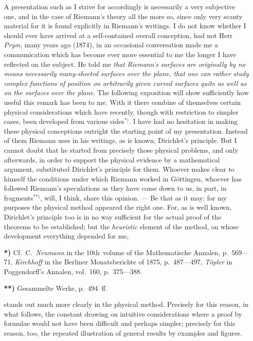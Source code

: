 \documentclass{article}
\begin{document}
A presentation such as I strive for accordingly is necessarily a very subjective one, and in the case of Riemann's theory all the more so, since only very scanty material for it is found explicitly in Riemann's writings. I do not know whether I should ever have arrived at a self-contained overall conception, had not Herr \emph{Prym}, many years ago (1874), in an occasional conversation made me a communication which has become ever more essential to me the longer I have reflected on the subject. He told me \emph{that Riemann's surfaces are originally by no means necessarily many-sheeted surfaces over the plane, that one can rather study complex functions of position on arbitrarily given curved surfaces quite as well as on the surfaces over the plane}. The following exposition will show sufficiently how useful this remark has been to me. With it there combine of themselves certain physical considerations which have recently, though with restriction to simpler cases, been developed from various sides${}^{*)}$. I have had no hesitation in making these physical conceptions outright the starting point of my presentation. Instead of them Riemann uses in his writings, as is known, Dirichlet's principle. But I cannot doubt that he started from precisely those physical problems, and only afterwards, in order to support the physical evidence by a mathematical argument, substituted Dirichlet's principle for them. Whoever makes clear to himself the conditions under which Riemann worked in Göttingen, whoever has followed Riemann's speculations as they have come down to us, in part, in fragments${}^{**)}$, will, I think, share this opinion. --- Be that as it may: for my purposes the physical method appeared the right one. For, as is well known, Dirichlet's principle too is in no way sufficient for the actual proof of the theorems to be established; but the \emph{heuristic} element of the method, on whose development everything depended for me,

\textbf{*)} Cf.\ C.\ \emph{Neumann} in the 10th~volume of the Mathematische Annalen, p.~569---71, \emph{Kirchhoff} in the Berliner Monatsberichte of 1875, p.~487---497, \emph{Töpler} in Poggendorff's Annalen, vol.~160, p.~375---388.

\textbf{**)} Gesammelte Werke, p.~494~ff.

stands out much more clearly in the physical method. Precisely for this reason, in what follows, the constant drawing on intuitive considerations where a proof by formulae would not have been difficult and perhaps simpler; precisely for this reason, too, the repeated illustration of general results by examples and figures.
\end{document}

